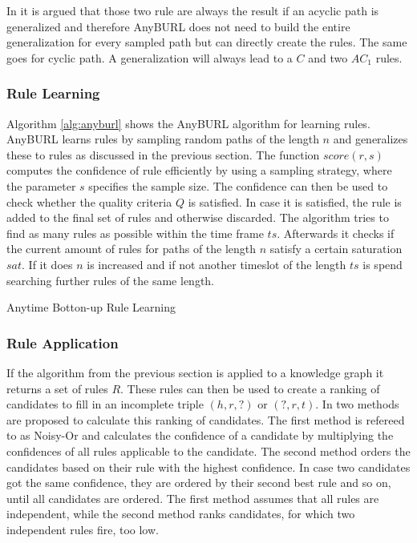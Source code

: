 In \cite{meilicke_reinforced_2020} it is argued that those two rule are always the result if an acyclic path is generalized and therefore AnyBURL does not need to build the entire generalization for every sampled path but can directly create the rules. The same goes for cyclic path. A generalization will always lead to a $C$ and two $AC_1$ rules.   

\subsubsection{Rule Learning}
\label{cha:anyburl_learning}
Algorithm \ref{alg:anyburl} shows the AnyBURL algorithm for learning rules. AnyBURL learns rules by sampling random paths of the length $n$ and generalizes these to rules as discussed in the previous section. The function $score(r,s)$ computes the confidence of rule efficiently by using a sampling strategy, where the parameter $s$ specifies the sample size. The confidence can then be used to check whether the quality criteria $Q$ is satisfied. In case it is satisfied, the rule is added to the final set of rules and otherwise discarded. The algorithm tries to find as many rules as possible within the time frame $ts$. Afterwards it checks if the current amount of rules for paths of the length $n$ satisfy a certain saturation $sat$. If it does $n$ is increased and if not another timeslot of the length $ts$ is spend searching further rules of the same length. \cite{meilicke_anytime_2019}

\begin{algorithm}[H]
\caption{Anytime Botton-up Rule Learning}
\label{alg:anyburl}
\begin{algorithmic}[1]
\end{algorithmic}
\end{algorithm}

\subsubsection{Rule Application}
If the algorithm from the previous section is applied to a knowledge graph it returns a set of rules $R$. These rules can then be used to create a ranking of candidates to fill in an incomplete triple $(h,r,?)$ or $(?,r,t)$. In \cite{meilicke_anytime_2019} two methods are proposed to calculate this ranking of candidates. 
The first method is refereed to as Noisy-Or and calculates the confidence of a candidate by multiplying the confidences of all rules applicable to the candidate. 
The second method orders the candidates based on their rule with the highest confidence. In case two candidates got the same confidence, they are ordered by their second best rule and so on, until all candidates are ordered. 
The first method assumes that all rules are independent, while the second method ranks candidates, for which two independent rules fire, too low. 

